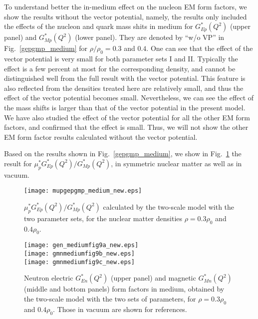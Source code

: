 \documentclass[preprint,aps,showpacs,floatfix]{revtex4}
\begin{document}
To understand better the in-medium effect on the nucleon EM form factors, we show 
the results without the vector potential, namely, the results only included the 
effects of the nucleon and quark mass shits in medium for 
$G^*_{Ep}(Q^2)$ (upper panel) and $G^*_{Mp}(Q^2)$ (lower panel). 
They are denoted by ``w/o VP'' in Fig.~\ref{gepgmp_medium} for $\rho/\rho_0 = 0.3$ and $0.4$. 
One can see that the effect of the vector potential is very small 
for both parameter sets I and II. Typically the effect is a few percent at most 
for the corresponding density, and cannot be distinguished well 
from the full result with the vector potential.
This feature is also reflected from the densities treated here are 
relatively small, and thus the effect of the vector potential becomes small.
Nevertheless, we can see the effect of the mass shifts is larger than that 
of the vector potential in the present model.
We have also studied the effect of the vector potential for all the other 
EM form factors, and confirmed that the effect is small. 
Thus, we will not show the other EM form factor results calculated 
without the vector potential.

Based on the results shown in Fig.~\ref{gepgmp_medium}, 
we show in Fig.~\ref{mupgepgmp_med} the result for 
$\mu^*_p G^*_{Ep}(Q^2) / G^*_{Mp}(Q^2)$, in symmetric nuclear matter as well as in vacuum.
\begin{figure}[htbp]
\vspace*{1.2cm}
\texttt{[image: mupgepgmp\_medium\_new.eps]}
\caption{
$\mu^*_p G^*_{Ep}(Q^2)/G^*_{Mp}(Q^2)$ calculated by the two-scale model with the two 
parameter sets, for the nuclear matter densities $\rho = 0.3\rho_0$ and $0.4\rho_0$.
} 
\label{mupgepgmp_med}
\end{figure}
\begin{figure}[htbp]
\texttt{[image: gen\_mediumfig9a\_new.eps]}
\\
\vspace*{1.1cm}
\texttt{[image: gmnmediumfig9b\_new.eps]}
\\
\vspace{1.1cm}
\texttt{[image: gmnmediumfig9c\_new.eps]}
\caption{
Neutron electric $G^*_{En}(Q^2)$ (upper panel) and magnetic  
$G^*_{Mn}(Q^2)$ (middle and bottom panels) form factors in medium, 
obtained by the two-scale model with the two sets of parameters, 
for $\rho = 0.3\rho_0$ and $0.4\rho_0$.
Those in vacuum are shown for references.
} 
\label{gengmn_medium}
\end{figure}
\end{document}
